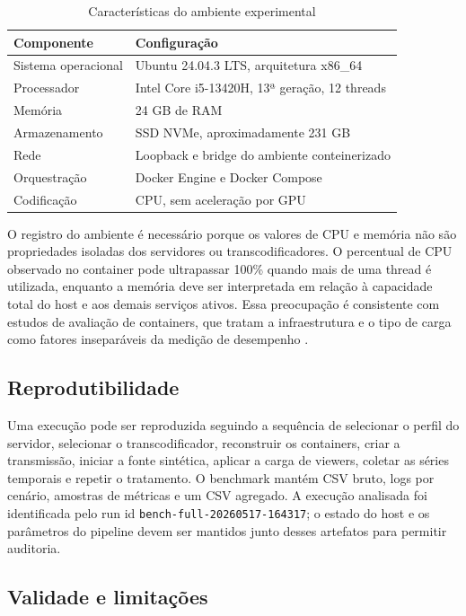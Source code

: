 \begin{table}[H]
\centering
\caption{Características do ambiente experimental}
\begin{tabularx}{\textwidth}{@{}lX@{}}
\toprule
Componente & Configuração \\
\midrule
Sistema operacional & Ubuntu 24.04.3 LTS, arquitetura x86\_64 \\
Processador & Intel Core i5-13420H, 13ª geração, 12 threads \\
Memória & 24 GB de RAM \\
Armazenamento & SSD NVMe, aproximadamente 231 GB \\
Rede & Loopback e bridge do ambiente conteinerizado \\
Orquestração & Docker Engine e Docker Compose \\
Codificação & CPU, sem aceleração por GPU \\
\bottomrule
\end{tabularx}
\end{table}

O registro do ambiente é necessário porque os valores de CPU e memória não são propriedades isoladas dos servidores ou transcodificadores. O percentual de CPU observado no container pode ultrapassar 100\% quando mais de uma thread é utilizada, enquanto a memória deve ser interpretada em relação à capacidade total do host e aos demais serviços ativos. Essa preocupação é consistente com estudos de avaliação de containers, que tratam a infraestrutura e o tipo de carga como fatores inseparáveis da medição de desempenho \citep{shirinbab}.

\subsection{Reprodutibilidade}

Uma execução pode ser reproduzida seguindo a sequência de selecionar o perfil do servidor, selecionar o transcodificador, reconstruir os containers, criar a transmissão, iniciar a fonte sintética, aplicar a carga de viewers, coletar as séries temporais e repetir o tratamento. O benchmark mantém CSV bruto, logs por cenário, amostras de métricas e um CSV agregado. A execução analisada foi identificada pelo run id \texttt{bench-full-20260517-164317}; o estado do host e os parâmetros do pipeline devem ser mantidos junto desses artefatos para permitir auditoria.

\subsection{Validade e limitações}

